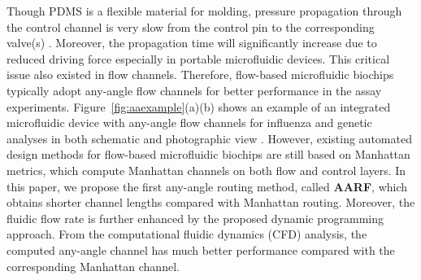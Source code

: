 \documentclass[journal]{IEEEtran}
\begin{document}
Though PDMS is a flexible material for molding, pressure propagation through the control channel is very slow from the control pin to the corresponding valve(s) \cite{Lim:2010iq}. 
Moreover, the propagation time will significantly increase due to reduced driving 
force especially in portable microfluidic devices. This critical issue also existed in flow channels.
Therefore, flow-based microfluidic biochips typically adopt any-angle flow channels for better performance in the assay experiments. Figure~\ref{fig:aaexample}(a)(b) shows an example of an integrated microfluidic device with any-angle flow channels for influenza and genetic analyses in both schematic and photographic view \cite{Pal:2005}. However, existing automated design methods for flow-based microfluidic biochips are still based on Manhattan metrics, which compute Manhattan channels on both flow and control layers. 
In this paper, we propose the first any-angle routing method, called {\bf AARF}, which obtains shorter channel lengths compared with Manhattan routing. Moreover, the fluidic flow rate is further enhanced by 
the proposed dynamic programming approach. From the computational fluidic dynamics (CFD) analysis, the computed any-angle channel has much better performance compared with the corresponding Manhattan channel.
\end{document}
